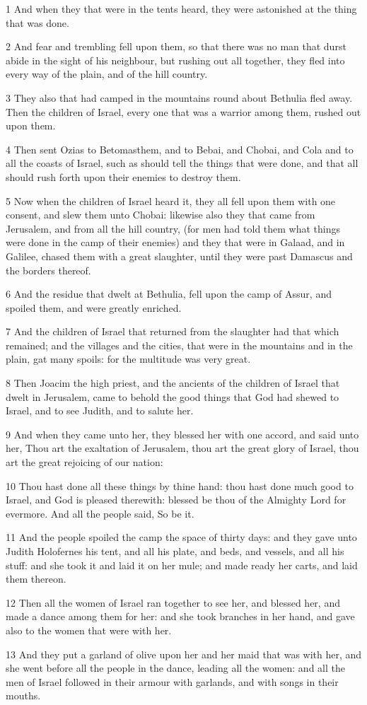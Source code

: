 \par 1 And when they that were in the tents heard, they were astonished at the thing that was done.
\par 2 And fear and trembling fell upon them, so that there was no man that durst abide in the sight of his neighbour, but rushing out all together, they fled into every way of the plain, and of the hill country.
\par 3 They also that had camped in the mountains round about Bethulia fled away. Then the children of Israel, every one that was a warrior among them, rushed out upon them.
\par 4 Then sent Ozias to Betomasthem, and to Bebai, and Chobai, and Cola and to all the coasts of Israel, such as should tell the things that were done, and that all should rush forth upon their enemies to destroy them.
\par 5 Now when the children of Israel heard it, they all fell upon them with one consent, and slew them unto Chobai: likewise also they that came from Jerusalem, and from all the hill country, (for men had told them what things were done in the camp of their enemies) and they that were in Galaad, and in Galilee, chased them with a great slaughter, until they were past Damascus and the borders thereof.
\par 6 And the residue that dwelt at Bethulia, fell upon the camp of Assur, and spoiled them, and were greatly enriched.
\par 7 And the children of Israel that returned from the slaughter had that which remained; and the villages and the cities, that were in the mountains and in the plain, gat many spoils: for the multitude was very great.
\par 8 Then Joacim the high priest, and the ancients of the children of Israel that dwelt in Jerusalem, came to behold the good things that God had shewed to Israel, and to see Judith, and to salute her.
\par 9 And when they came unto her, they blessed her with one accord, and said unto her, Thou art the exaltation of Jerusalem, thou art the great glory of Israel, thou art the great rejoicing of our nation:
\par 10 Thou hast done all these things by thine hand: thou hast done much good to Israel, and God is pleased therewith: blessed be thou of the Almighty Lord for evermore. And all the people said, So be it.
\par 11 And the people spoiled the camp the space of thirty days: and they gave unto Judith Holofernes his tent, and all his plate, and beds, and vessels, and all his stuff: and she took it and laid it on her mule; and made ready her carts, and laid them thereon.
\par 12 Then all the women of Israel ran together to see her, and blessed her, and made a dance among them for her: and she took branches in her hand, and gave also to the women that were with her.
\par 13 And they put a garland of olive upon her and her maid that was with her, and she went before all the people in the dance, leading all the women: and all the men of Israel followed in their armour with garlands, and with songs in their mouths.

